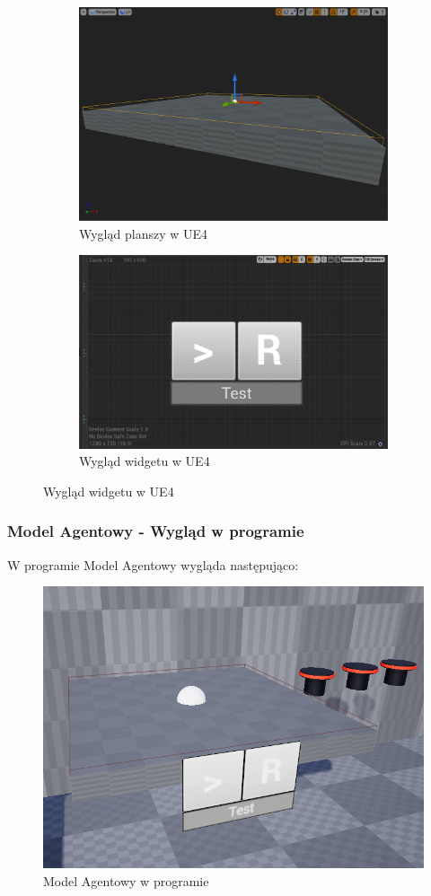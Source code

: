 \documentclass[a4paper,12pt,reqno]{article}
\begin{document}
\begin{figure}[H]%
	\centering
	\begin{subfigure}{.5\textwidth}
		\centering
		\includegraphics[width=0.8\linewidth]{graphics//agent/BP_AgentTable.png}
		\caption{Wygląd planszy w UE4}	
		\label{ref:subref_a}
	\end{subfigure}%
	\begin{subfigure}{.5\textwidth}
		\centering
		\includegraphics[width=0.8\linewidth]{graphics//agent/BP_AgentControl.png}
		\caption{Wygląd widgetu w UE4}
		\label{ref:subref_b}
	\end{subfigure}%
\label{ref:ref}
\end{figure}

\subsubsection{Model Agentowy - Wygląd w programie}
W programie Model Agentowy wygląda następująco:

\begin{figure}[H]%
\centering
\includegraphics[width=0.7\columnwidth]{graphics/agent/AgentInUE_1.png}
\caption{Model Agentowy w programie
\label{BPExample}}%
%
\qquad
\end{figure}  
\end{document}
